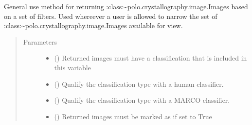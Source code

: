 \documentclass[letterpaper,10pt,english]{sphinxmanual}
\begin{document}
\begin{fulllineitems}
\begin{fulllineitems}
\label{\detokenize{polo.crystallography:polo.crystallography.run.Run.image_filter_query}}
General use method for returning :class:{\color{red}\bfseries{}\textasciigrave{}}\textasciitilde{}polo.crystallography.image.Image\textasciigrave{}s
based on a set of filters. Used whereever a user is allowed to narrow the set
of :class:{\color{red}\bfseries{}\textasciigrave{}}\textasciitilde{}polo.crystallography.image.Image\textasciigrave{}s available for view.
\begin{quote}\begin{description}
\item[{Parameters}] \leavevmode\begin{itemize}
\item {} 
 () \textendash{} Returned images must have a
classification that is included in 
this variable

\item {} 
 () \textendash{} Qualify the classification type
with a human classifier.

\item {} 
 () \textendash{} Qualify the classification type with
a MARCO classifier.

\item {} 
 () \textendash{} Returned images must be marked as 
 if set to True

\end{itemize}

\end{description}\end{quote}

\end{fulllineitems}



\end{fulllineitems}
\end{document}
